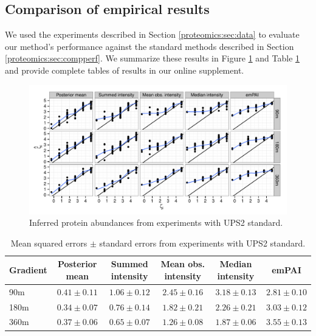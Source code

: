 
\subsection{Comparison of empirical results}
\label{proteomics:sec:dataanalysis}

We used the experiments described in Section \ref{proteomics:sec:data} to evaluate our method's performance against the standard methods described in Section \ref{proteomics:sec:compperf}.
We summarize these results in Figure \ref{proteomics:fig:UPS2 results} and Table \ref{proteomics:tab:UPS2 results} and provide complete tables of results in our online supplement.
%
\begin{figure}
\centering
\includegraphics[width=\textwidth]{figures/proteomics/figures_draft_ups2}
\caption{Inferred protein abundances from experiments with UPS2 standard.
\label{proteomics:fig:UPS2 results}}
\end{figure}
%
\begin{table}
\centering
\caption{Mean squared errors $\pm$ standard errors from experiments with UPS2 standard.
\label{proteomics:tab:UPS2 results}}
\begin{tabular}{l|ccccc}
  \hline
Gradient & Posterior mean & Summed intensity & Mean obs. intensity & Median intensity & emPAI \\ 
  \hline
90m & $0.41 \pm 0.11$ & $1.06 \pm 0.12$ & $2.45 \pm 0.16$ & $3.18 \pm 0.13$ & $2.81 \pm 0.10$ \\ 
  180m & $0.34 \pm 0.07$ & $0.76 \pm 0.14$ & $1.82 \pm 0.21$ & $2.26 \pm 0.21$ & $3.03 \pm 0.12$ \\ 
  360m & $0.37 \pm 0.06$ & $0.65 \pm 0.07$ & $1.26 \pm 0.08$ & $1.87 \pm 0.06$ & $3.55 \pm 0.13$ \\ 
   \hline
\end{tabular}
\end{table}
